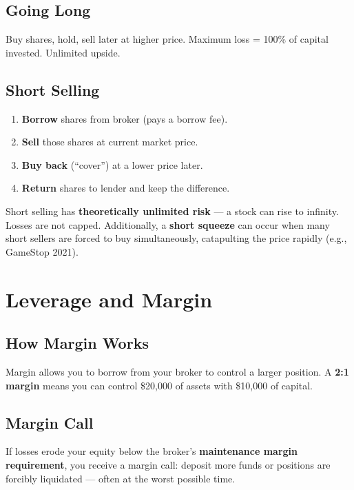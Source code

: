 \subsection{Going Long}
Buy shares, hold, sell later at higher price. Maximum loss = 100\% of capital invested.
Unlimited upside.

\subsection{Short Selling}
\begin{enumerate}[label=\arabic*.]
  \item \textbf{Borrow} shares from broker (pays a borrow fee).
  \item \textbf{Sell} those shares at current market price.
  \item \textbf{Buy back} (``cover'') at a lower price later.
  \item \textbf{Return} shares to lender and keep the difference.
\end{enumerate}

\begin{warningbox}
Short selling has \textbf{theoretically unlimited risk} — a stock can rise to infinity.
Losses are not capped. Additionally, a \textbf{short squeeze} can occur when many short sellers
are forced to buy simultaneously, catapulting the price rapidly (e.g., GameStop 2021).
\end{warningbox}

\section{Leverage and Margin}

\subsection{How Margin Works}
Margin allows you to borrow from your broker to control a larger position.
A \textbf{2:1 margin} means you can control \$20{,}000 of assets with \$10{,}000 of capital.

\subsection{Margin Call}
If losses erode your equity below the broker's \textbf{maintenance margin requirement},
you receive a margin call: deposit more funds or positions are forcibly liquidated —
often at the worst possible time.

